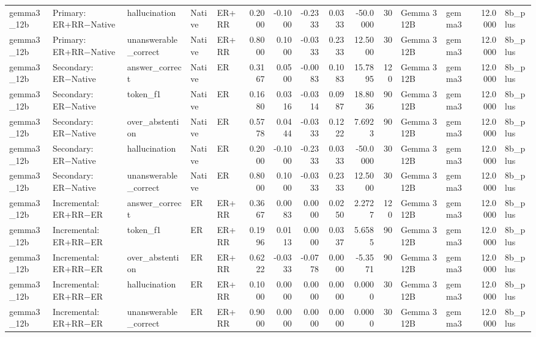 \begin{tabular}{lllllrrrrrrllrl}
gemma3_12b & Primary: ER+RR−Native & hallucination & Native & ER+RR & 0.2000 & -0.1000 & -0.2333 & 0.0333 & -50.0000 & 30 & Gemma 3 12B & gemma3 & 12.0000 & 8b_plus \\
gemma3_12b & Primary: ER+RR−Native & unanswerable_correct & Native & ER+RR & 0.8000 & 0.1000 & -0.0333 & 0.2333 & 12.5000 & 30 & Gemma 3 12B & gemma3 & 12.0000 & 8b_plus \\
gemma3_12b & Secondary: ER−Native & answer_correct & Native & ER & 0.3167 & 0.0500 & -0.0083 & 0.1083 & 15.7895 & 120 & Gemma 3 12B & gemma3 & 12.0000 & 8b_plus \\
gemma3_12b & Secondary: ER−Native & token_f1 & Native & ER & 0.1680 & 0.0316 & -0.0314 & 0.0987 & 18.8036 & 90 & Gemma 3 12B & gemma3 & 12.0000 & 8b_plus \\
gemma3_12b & Secondary: ER−Native & over_abstention & Native & ER & 0.5778 & 0.0444 & -0.0333 & 0.1222 & 7.6923 & 90 & Gemma 3 12B & gemma3 & 12.0000 & 8b_plus \\
gemma3_12b & Secondary: ER−Native & hallucination & Native & ER & 0.2000 & -0.1000 & -0.2333 & 0.0333 & -50.0000 & 30 & Gemma 3 12B & gemma3 & 12.0000 & 8b_plus \\
gemma3_12b & Secondary: ER−Native & unanswerable_correct & Native & ER & 0.8000 & 0.1000 & -0.0333 & 0.2333 & 12.5000 & 30 & Gemma 3 12B & gemma3 & 12.0000 & 8b_plus \\
gemma3_12b & Incremental: ER+RR−ER & answer_correct & ER & ER+RR & 0.3667 & 0.0083 & 0.0000 & 0.0250 & 2.2727 & 120 & Gemma 3 12B & gemma3 & 12.0000 & 8b_plus \\
gemma3_12b & Incremental: ER+RR−ER & token_f1 & ER & ER+RR & 0.1996 & 0.0113 & 0.0000 & 0.0337 & 5.6585 & 90 & Gemma 3 12B & gemma3 & 12.0000 & 8b_plus \\
gemma3_12b & Incremental: ER+RR−ER & over_abstention & ER & ER+RR & 0.6222 & -0.0333 & -0.0778 & 0.0000 & -5.3571 & 90 & Gemma 3 12B & gemma3 & 12.0000 & 8b_plus \\
gemma3_12b & Incremental: ER+RR−ER & hallucination & ER & ER+RR & 0.1000 & 0.0000 & 0.0000 & 0.0000 & 0.0000 & 30 & Gemma 3 12B & gemma3 & 12.0000 & 8b_plus \\
gemma3_12b & Incremental: ER+RR−ER & unanswerable_correct & ER & ER+RR & 0.9000 & 0.0000 & 0.0000 & 0.0000 & 0.0000 & 30 & Gemma 3 12B & gemma3 & 12.0000 & 8b_plus \\
\bottomrule
\end{tabular}
